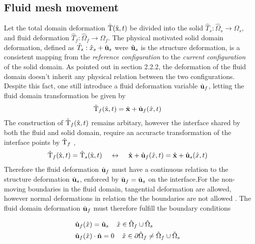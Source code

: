\subsection{Fluid mesh movement}
 Let the total domain deformation $\text{\^{T}}(\text{\^{x}}, t)$ be divided into the solid  $\hat{T}_s: \hat{\Omega}_s \rightarrow \Omega_s$, and fluid deformation $\hat{T}_f: \hat{\Omega}_f \rightarrow \Omega_f$. The physical motivated solid domain deformation, defined as $\hat{T}_s: \hat{x}_s + \hat{\mathbf{u}}_s$ were $\hat{\mathbf{u}}_s$ is the structure deformation, is 
a consistent mapping from the \textit{reference configuration} to the \textit{current configuration} of the solid domain. As pointed out in section 2.2.2, the deformation of the fluid domain doesn't inherit any physical relation between the two configurations. Despite this fact, one still introduce a fluid deformation variable $\hat{\mathbf{u}}_f$, letting the fluid domain transformation be given by 
\begin{align*}
\text{\^{T}}_f(\text{\^{x}}, t) = \hat{\mathbf{x}} + \hat{\mathbf{u}}_f(\hat{x}, t)
\end{align*}
The construction of $\text{\^{T}}_f(\text{\^{x}}, t) $ remains arbitary, however the interface shared by both the fluid and solid domain, require an accuracte transformation of the interface points by $\text{\^{T}}_f$ \cite{Richter2016}, 
\begin{align*}
\text{\^{T}}_f(\text{\^{x}}, t) = \text{\^{T}}_s(\text{\^{x}}, t) \hspace{4mm}  \leftrightarrow  
\hspace{4mm}\hat{\mathbf{x}} + \hat{\mathbf{u}}_f(\hat{x}, t) =  \hat{\mathbf{x}} + \hat{\mathbf{u}}_s(\hat{x}, t)
\end{align*}
Therefore the fluid deformation $\hat{\mathbf{u}}_f$ must have a continuous relation to the structure deformation $\hat{\mathbf{u}}_s$, enforced by $\hat{\mathbf{u}}_f = \hat{\mathbf{u}}_s$ on the interface.For the non-moving boundaries in the fluid domain, tangential deformation are allowed, however normal deformations in relation the the boundaries are not allowed \cite{Richter2010c}. The fluid domain deformation $\hat{\mathbf{u}}_f$ must therefore fulfill the boundary conditions 

\begin{align}
&\hat{\mathbf{u}}_f(\hat{x}) = \hat{\mathbf{u}}_s \hspace{4mm} \hat{x} \in \hat{\Omega}_f \cup  \hat{\Omega}_s \\
&\hat{\mathbf{u}}_f(\hat{x}) \cdot \hat{\mathbf{n}} = 0  \hspace{4mm}  \hat{x} \in \partial \hat{\Omega}_f \neq \hat{\Omega}_f \cup  \hat{\Omega}_s
\end{align} 

